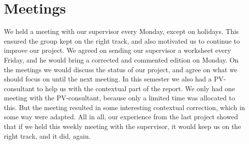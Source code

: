 \section{Meetings}
We held a meeting with our supervisor every Monday, except on holidays. This ensured the group kept on the right track, and also motivated us to continue to improve our project. We agreed on sending our supervisor a worksheet every Friday, and he would bring a corrected and commented edition on Monday. On the meetings we would discuss the status of our project, and agree on what we should focus on until the next meeting. In this semester we also had a PV-consultant to help us with the contextual part of the report. We only had one meeting with the PV-consultant, because only a limited time was allocated to this. But the meeting resulted in some interesting contextual correction, which in some way were adapted. All in all, our experience from the last project showed that if we held this weekly meeting with the supervisor, it would keep us on the right track, and it did, again. 